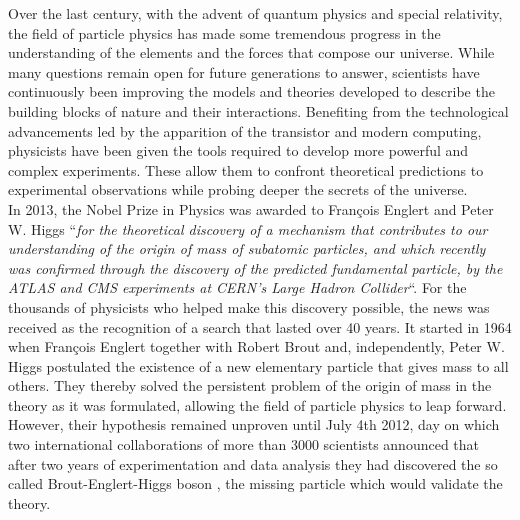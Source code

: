 
Over the last century, with the advent of quantum physics and special relativity, the field of particle physics has made some tremendous progress in the understanding of the elements and the forces that compose our universe. While many questions remain open for future generations to answer, scientists have continuously been improving the models and theories developed to describe the building blocks of nature and their interactions. Benefiting from the technological advancements led by the apparition of the transistor and modern computing, physicists have been given the tools required to develop more powerful and complex experiments. These allow them to confront theoretical predictions to experimental observations while probing deeper the secrets of the universe. \\

In 2013, the Nobel Prize in Physics was awarded to Fran\c{c}ois Englert and Peter W. Higgs ``\textit{for the theoretical discovery of a mechanism that contributes to our understanding of the origin of mass of subatomic particles, and which recently was confirmed through the discovery of the predicted fundamental particle, by the ATLAS and CMS experiments at CERN's Large Hadron Collider}``. For the thousands of physicists who helped make this discovery possible, the news was received as the recognition of a search that lasted over 40 years. It started in 1964 when Fran\c{c}ois Englert together with Robert Brout \cite{PhysRevLett.13.321} and, independently, Peter W. Higgs \cite{PhysRevLett.13.508} postulated the existence of a new elementary particle that gives mass to all others. They thereby solved the persistent problem of the origin of mass in the theory as it was formulated, allowing the field of particle physics to leap forward. However, their hypothesis remained unproven until July 4th 2012, day on which two international collaborations of more than 3000 scientists announced that after two years of experimentation and data analysis they had discovered the so called Brout-Englert-Higgs boson \cite{PhysRevLett.114.191803}, the missing particle which would validate the theory. \\

